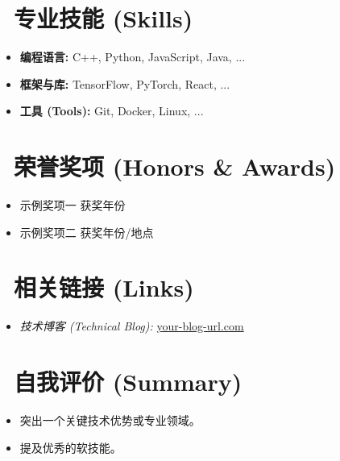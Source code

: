 \documentclass{resume}
\begin{document}
\section{\faWrench\ 专业技能 (Skills)}
\begin{itemize}
    \item \textbf{编程语言:} C++, Python, JavaScript, Java, ...
    \item \textbf{框架与库:} TensorFlow, PyTorch, React, ...
    \item \textbf{工具 (Tools):} Git, Docker, Linux, ...
\end{itemize}

\section{\faDiamond\ 荣誉奖项 (Honors & Awards)}
\begin{itemize}
  \item 示例奖项一 \hfill{获奖年份}
  \item 示例奖项二 \hfill{获奖年份/地点}
\end{itemize}

\section{\faLink\ 相关链接 (Links)}
\begin{itemize}
    \item \textit{技术博客 (Technical Blog):} \href{https://your-blog-url.com}{your-blog-url.com}
\end{itemize}

\section{\faThumbsOUp\ 自我评价 (Summary)}
\begin{itemize}
  \item 突出一个关键技术优势或专业领域。
  \item 提及优秀的软技能。
\end{itemize}

\end{document}
